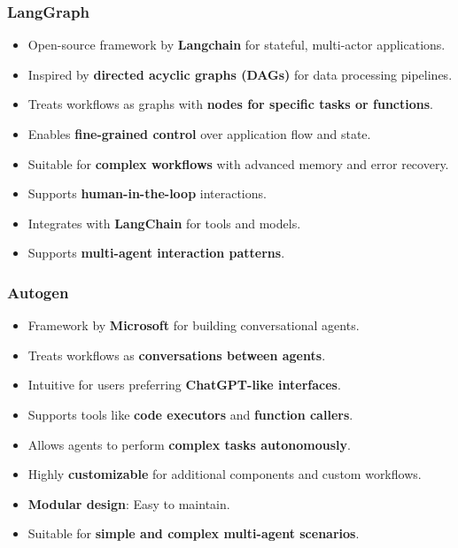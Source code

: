 \begin{frame}[fragile]\frametitle{LangGraph}
\begin{itemize}
    \item Open-source framework by \textbf{Langchain} for stateful, multi-actor applications.
    \item Inspired by \textbf{directed acyclic graphs (DAGs)} for data processing pipelines.
    \item Treats workflows as graphs with \textbf{nodes for specific tasks or functions}.
    \item Enables \textbf{fine-grained control} over application flow and state.
    \item Suitable for \textbf{complex workflows} with advanced memory and error recovery.
    \item Supports \textbf{human-in-the-loop} interactions.
    \item Integrates with \textbf{LangChain} for tools and models.
    \item Supports \textbf{multi-agent interaction patterns}.
\end{itemize}
\end{frame}

\begin{frame}[fragile]\frametitle{Autogen}
\begin{itemize}
    \item Framework by \textbf{Microsoft} for building conversational agents.
    \item Treats workflows as \textbf{conversations between agents}.
    \item Intuitive for users preferring \textbf{ChatGPT-like interfaces}.
    \item Supports tools like \textbf{code executors} and \textbf{function callers}.
    \item Allows agents to perform \textbf{complex tasks autonomously}.
    \item Highly \textbf{customizable} for additional components and custom workflows.
    \item \textbf{Modular design}: Easy to maintain.
    \item Suitable for \textbf{simple and complex multi-agent scenarios}.
\end{itemize}
\end{frame}

